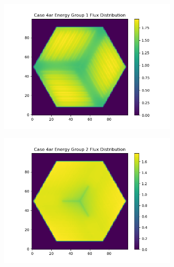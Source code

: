\documentclass[letterpaper,11pt]{report}
\begin{document}
\begin{figure}[H]
          \begin{subfigure}{.33\textwidth}
            \centering
            \includegraphics[width=1.1\linewidth]{../../phase1a/case4ar/analysis_output/p1a_4ar_e_eg1.png}
            \caption{}
          \end{subfigure}%
          \begin{subfigure}{.33\textwidth}
            \centering
            \includegraphics[width=1.1\linewidth]{../../phase1a/case4ar/analysis_output/p1a_4ar_e_eg2.png}
            \caption{}
          \end{subfigure}
          \begin{subfigure}{.33\textwidth}
            \centering

\end{subfigure}
\end{figure}
\end{document}
